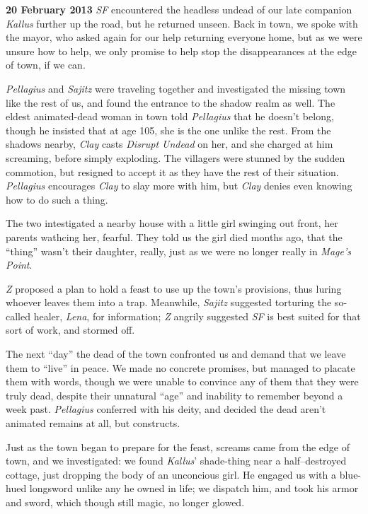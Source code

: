 \documentclass[letterpaper]{article}
\begin{document}
\textbf{20 February 2013} \emph{SF} encountered the headless undead of our late companion \emph{Kallus} further up the road, but he returned unseen.  Back in town, we spoke with the mayor, who asked again for our help returning everyone home, but as we were unsure how to help, we only promise to help stop the disappearances at the edge of town, if we can.\par
\emph{Pellagius} and \emph{Sajitz} were traveling together and investigated the missing town like the rest of us, and found the entrance to the shadow realm as well.  The eldest animated-dead woman in town told \emph{Pellagius} that he doesn't belong, though he insisted that at age 105, she is the one unlike the rest.  From the shadows nearby, \emph{Clay} casts \emph{Disrupt Undead} on her, and she charged at him screaming, before simply exploding.  The villagers were stunned by the sudden commotion, but resigned to accept it as they have the rest of their situation.  \emph{Pellagius} encourages \emph{Clay} to slay more with him, but \emph{Clay} denies even knowing how to do such a thing.\par
The two intestigated a nearby house with a little girl swinging out front, her parents wathcing her, fearful. They told us the girl died months ago, that the ``thing'' wasn't their daughter, really, just as we were no longer really in \emph{Mage's Point}.\par
\emph{Z} proposed a plan to hold a feast to use up the town's provisions, thus luring whoever leaves them into a trap.  Meanwhile, \emph{Sajitz} suggested torturing the so-called healer, \emph{Lena}, for information; \emph{Z} angrily suggested \emph{SF} is best suited for that sort of work, and stormed off.\par
The next ``day'' the dead of the town confronted us and demand that we leave them to ``live'' in peace.  We made no concrete promises, but managed to placate them with words, though we were unable to convince any of them that they were truly dead, despite their unnatural ``age'' and inability to remember beyond a week past.  \emph{Pellagius} conferred with his deity, and decided the dead aren't animated remains at all, but constructs.\par
Just as the town began to prepare for the feast, screams came from the edge of town, and we investigated: we found \emph{Kallus}' shade-thing near a half--destroyed cottage, just dropping the body of an unconcious girl.  He engaged us with a blue-hued longsword unlike any he owned in life; we dispatch him, and took his armor and sword, which though still magic, no longer glowed.\\
\end{document}
